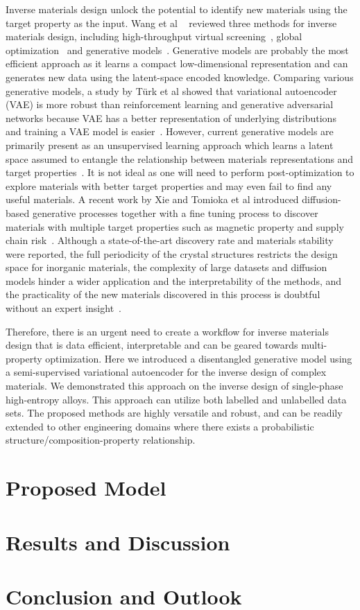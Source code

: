 \documentclass[a4paper]{article}
\begin{document}
Inverse materials design unlock the potential to identify new materials using the target property as the input.
Wang et al ~\cite{wang2022} reviewed three methods for inverse materials design, including high-throughput virtual screening~\cite{afzal2019}, global optimization~\cite{geng2019} and generative models~\cite{ma2019, popova2018}.
Generative models are probably the most efficient approach as it learns a compact low-dimensional representation and can generates new data using the latent-space encoded knowledge.
Comparing various generative models, a study by T\"{u}rk et al showed that variational autoencoder (VAE) is more robust than reinforcement learning and generative adversarial networks because VAE has a better representation of underlying distributions and training a VAE model is easier~\cite{turk2022}.
However, current generative models are primarily present as an unsupervised learning approach which learns a latent space assumed to entangle the relationship between materials representations and target properties~\cite{chen2020, wang2022}.
It is not ideal as one will need to perform post-optimization to explore materials with better target properties and may even fail to find any useful materials.
A recent work by Xie and Tomioka et al introduced diffusion-based generative processes together with a fine tuning process to discover materials with multiple target properties such as magnetic property and supply chain risk~\cite{zeni2024}.
Although a state-of-the-art discovery rate and materials stability were reported, the full periodicity of the crystal structures restricts the design space for inorganic materials, the complexity of large datasets and diffusion models hinder a wider application and the interpretability of the methods, and the practicality of the new materials discovered in this process is doubtful without an expert insight~\cite{cheetham2024}.

Therefore, there is an urgent need to create a workflow for inverse materials design that is data efficient, interpretable and can be geared towards multi-property optimization.
Here we introduced a disentangled generative model using a semi-supervised variational autoencoder for the inverse design of complex materials.
We demonstrated this approach on the inverse design of single-phase high-entropy alloys.
This approach can utilize both labelled and unlabelled data sets. The proposed methods are highly versatile and robust, and can be readily extended to other engineering domains where there exists a probabilistic structure/composition-property relationship.

\section{Proposed Model}

\section{Results and Discussion}

\section{Conclusion and Outlook}




\end{document}
